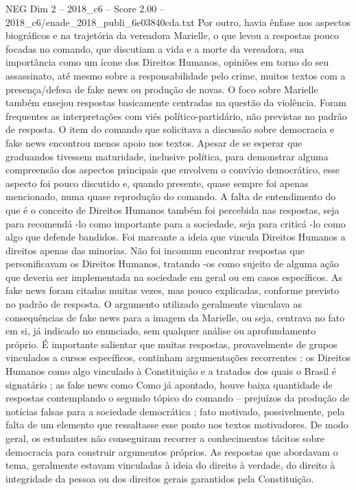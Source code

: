 \begin{textsample}{NEG Dim 2 – 2018\_c6 – Score 2.00 – 2018\_c6/enade\_2018\_publi\_6e03840cda.txt}
Por outro, havia ênfase nos aspectos biográficos e na trajetória da vereadora Marielle, o que levou a respostas pouco focadas no comando, que discutiam a vida e a morte da vereadora, sua importância como um ícone dos Direitos Humanos, opiniões em torno do seu assassinato, até mesmo sobre a responsabilidade pelo crime, muitos textos com a presença/defesa de fake news ou produção de novas.
O foco sobre Marielle também ensejou respostas basicamente centradas na questão da violência.
Foram frequentes as interpretações com viés político-partidário, não previstas no padrão de resposta.
O item do comando que solicitava a discussão sobre democracia e fake news encontrou menos apoio nos textos.
Apesar de se esperar que graduandos tivessem maturidade, inclusive política, para demonstrar alguma compreensão dos aspectos principais que envolvem o convívio democrático, esse aspecto foi pouco discutido e, quando presente, quase sempre foi apenas mencionado, numa quase reprodução do comando.
A falta de entendimento do que é o conceito de Direitos Humanos também foi percebida nas respostas, seja para recomendá -lo como importante para a sociedade, seja para criticá -lo como algo que defende bandidos.
Foi marcante a ideia que vincula Direitos Humanos a direitos apenas das minorias.
Não foi incomum encontrar respostas que personificavam os Direitos Humanos, tratando -os como sujeito de alguma ação que deveria ser implementada na sociedade em geral ou em casos específicos.
As fake news foram citadas muitas vezes, mas pouco explicadas, conforme previsto no padrão de resposta.
O argumento utilizado geralmente vinculava as consequências de fake news para a imagem da Marielle, ou seja, centrava no fato em si, já indicado no enunciado, sem qualquer análise ou aprofundamento próprio.
É importante salientar que muitas respostas, provavelmente de grupos vinculados a cursos específicos, continham argumentações recorrentes : os Direitos Humanos como algo vinculado à Constituição e a tratados dos quais o Brasil é signatário ; as fake news como Como já apontado, houve baixa quantidade de respostas contemplando o segundo tópico do comando – prejuízos da produção de notícias falsas para a sociedade democrática ; fato motivado, possivelmente, pela falta de um elemento que ressaltasse esse ponto nos textos motivadores.
De modo geral, os estudantes não conseguiram recorrer a conhecimentos tácitos sobre democracia para construir argumentos próprios.
As respostas que abordavam o tema, geralmente estavam vinculadas à ideia do direito à verdade, do direito à integridade da pessoa ou dos direitos gerais garantidos pela Constituição.

\end{textsample}
